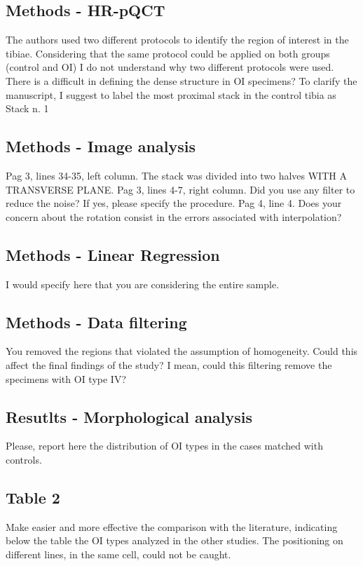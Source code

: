 \documentclass{AR2RC}
\begin{document}
\subsection{Methods - HR-pQCT}
The authors used two different protocols to identify the region of interest in the tibiae. Considering that the same protocol could be applied on both groups (control and OI) I do not understand why two different protocols were used. There is a difficult in defining the dense structure in OI specimens? To clarify the manuscript, I suggest to label the most proximal stack in the control tibia as Stack n. 1

\subsection{Methods - Image analysis}
Pag 3, lines 34-35, left column. The stack was divided into two halves WITH A TRANSVERSE PLANE. Pag 3, lines 4-7, right column. Did you use any filter to reduce the noise? If yes, please specify the procedure. Pag 4, line 4. Does your concern about the rotation consist in the errors associated with interpolation?

\subsection{Methods - Linear Regression}
I would specify here that you are considering the entire sample.

\subsection{Methods - Data filtering}
You removed the regions that violated the assumption of homogeneity. Could this affect the final findings of the study? I mean, could this filtering remove the specimens with OI type IV?

\subsection{Resutlts - Morphological analysis}
Please, report here the distribution of OI types in the cases matched with controls.

\subsection{Table 2}
Make easier and more effective the comparison with the literature, indicating below the table the OI types analyzed in the other studies. The positioning on different lines, in the same cell, could not be caught.
\end{document}
